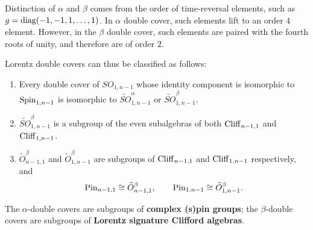 \documentclass[a4paper,11pt]{article}
\begin{document}
\begin{remark}
    Distinction of $\alpha$ and $\beta$ comes from the order of time-reversal elements, such as $g={\rm diag}(-1,-1,1,\dots,1)$. In $\alpha$ double cover, such elements lift to an order $4$ element. However, in the $\beta$ double cover, such elements are paired with the fourth roots of unity, and therefore are of order $2$.
\end{remark}

\begin{statement}
Lorentz double covers can thus be classified as follows:
    \begin{enumerate}
        \item Every double cover of $SO_{1,n-1}$ whose identity component is isomorphic to
        ${\rm Spin}_{1,n-1}$ is isomorphic to $\widetilde{SO}^{\alpha}_{1,n-1}$ or
        $\widetilde{SO}^{\beta}_{1,n-1}$.
        \item $\widetilde{SO}^{\beta}_{1,n-1}$ is a subgroup of the even subalgebras of both
        ${\rm Cliff}_{n-1,1}$ and ${\rm Cliff}_{1,n-1}$.
        \item $\widetilde{O}^{\beta}_{n-1,1}$ and $\widetilde{O}^{\beta}_{1,n-1}$ are subgroups
        of ${\rm Cliff}_{n-1,1}$ and ${\rm Cliff}_{1,n-1}$ respectively, and
        \[ {\rm Pin}_{n-1,1}\cong\widetilde{O}^{\beta}_{n-1,1},\qquad
           {\rm Pin}_{1,n-1}\cong\widetilde{O}^{\beta}_{1,n-1}. \]
    \end{enumerate}
    The $\alpha$-double covers are subgroups of {\bf complex (s)pin groups}; the
    $\beta$-double covers are subgroups of {\bf Lorentz signature Clifford algebras}.
\end{statement}
\end{document}
